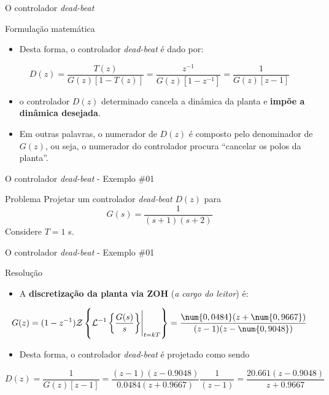 \begin{frame}{O controlador \textit{dead-beat}}
\begin{block}{Formulação matemática}
\begin{itemize}
    \item Desta forma, o controlador \textit{dead-beat} é dado por:
\end{itemize}
$$D(z) = \dfrac{T(z)}{G(z)[1-T(z)]} = \dfrac{z^{-1}}{G(z)[1-z^{-1}]} = \dfrac{1}{G(z)[z-1]}$$
\begin{itemize}
    \item o controlador $D(z)$ determinado cancela a dinâmica da planta e \textbf{impõe a dinâmica desejada}.
    \item Em outras palavras, o numerador de $D(z)$ é composto pelo denominador de $G(z)$, ou seja, o numerador do controlador procura ``cancelar os polos da planta''.
\end{itemize}
\end{block}
\end{frame}

\begin{frame}{O controlador \textit{dead-beat} - Exemplo \#01}
\begin{block}{Problema}
	Projetar um controlador \textit{dead-beat} $ D(z) $ para 
	$$ G(s)=\dfrac{1}{(s+1)(s+2)} $$
	Considere $T=1$ s.
\end{block}
\end{frame}

\begin{frame}{O controlador \textit{dead-beat} - Exemplo \#01}
\begin{block}{Resolução}
\begin{itemize}
    \item A \textbf{discretização da planta via ZOH} (\textit{a cargo do leitor}) é:
\end{itemize}
$$G(z)=(1-z^{-1})\mathcal{Z}\left\lbrace \mathcal{L}^{-1}\eval{\left\lbrace \dfrac{G(s)}{s}\right\rbrace}_{t=kT} \right\rbrace =\dfrac{\num{0,0484}(z+\num{0,9667})}{(z-1)(z-\num{0,9048})}$$
\begin{itemize}
    \item Desta forma, o controlador \textit{dead-beat} é projetado como sendo
\end{itemize}
$$D(z) = \dfrac{1}{G(z)[z-1]} = \dfrac{(z-1)(z-\num{0,9048})}{\num{0,0484}(z+\num{0,9667})} \dfrac{1}{(z-1)} = \dfrac{\num{20,661}(z-\num{0,9048})}{z+\num{0,9667}}$$
\end{block}
\end{frame}

